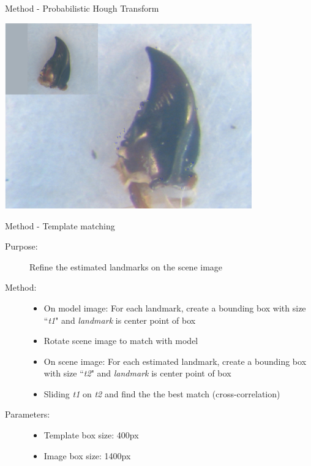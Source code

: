 \documentclass{beamer}
\begin{document}
\begin{frame}{Method - Probabilistic Hough Transform}
	\begin{center}
		\includegraphics[height=8cm]{images/pht19.JPG}	
	\end{center}
\end{frame}
\begin{frame}{Method - Template matching}
	\begin{description}
		\item [Purpose:] Refine the estimated landmarks on the scene image 
		\item [Method:] 
			\begin{itemize}
				\item On model image: For each landmark, create a bounding box with size ``\textit{t1}" and \textit{landmark} is center point of box
				\item Rotate scene image to match with model
				\item On scene image: For each estimated landmark, create a bounding box with size ``\textit{t2}" and \textit{landmark} is center point of box
				\item Sliding \textit{t1} on \textit{t2} and find the the best match (cross-correlation)
			\end{itemize}
		\item [Parameters:]
			\begin{itemize}
				\item Template box size: 400px
				\item Image box size: 1400px
			\end{itemize}
	\end{description}
\end{frame}
\end{document}
